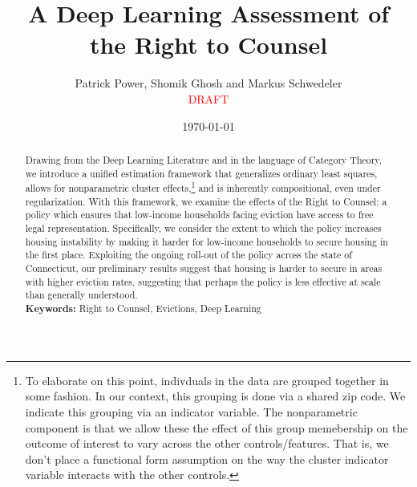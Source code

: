 \documentclass[a4paper,12pt]{article}
\begin{document}
\begin{titlepage}
\title{A Deep Learning Assessment of the Right to Counsel}

\author{Patrick Power, Shomik Ghosh and Markus Schwedeler \\ 
\textcolor{red}{DRAFT}}
\date{\today}
\maketitle
\thispagestyle{empty} %
\vspace{-2em}
\begin{abstract}
Drawing from the Deep Learning Literature and in the language of Category Theory, we introduce a unified estimation framework that generalizes ordinary least squares, allows for nonparametric cluster effects,\footnote{To elaborate on this point, indivduals in the data are grouped together in some fashion. In our context, this grouping is done via a shared zip code. We indicate this grouping via an indicator variable. The nonparametric component is that we allow these the effect of this group memebership on the outcome of interest to vary across the other controls/features. That is, we don't place a functional form assumption on the way the cluster indicator variable interacts with the other controls.} and is inherently compositional, even under regularization. With this framework, we examine the effects of the Right to Counsel: a policy which ensures that low-income households facing eviction have access to free legal representation. Specifically, we consider the extent to which the policy increases housing instability by making it harder for low-income households to secure housing in the first place. Exploiting the ongoing roll-out of the policy across the state of Connecticut, our preliminary results suggest that housing is harder to secure in areas with higher eviction rates, suggesting that perhaps the policy is less effective at scale than generally understood. 
\vspace{0.2in}\\
\noindent\textbf{Keywords:} Right to Counsel, Evictions, Deep Learning\\
\end{abstract}
\setcounter{page}{1}
\end{titlepage}

\end{document}
